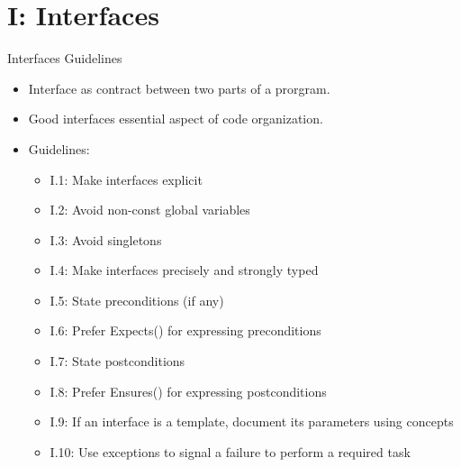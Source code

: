 \section{I: Interfaces}

\begin{frame}[t]{Interfaces Guidelines}
\begin{itemize}
  \item Interface as contract between two parts of a prorgram.
  \item Good interfaces essential aspect of code organization.

  \item Guidelines:
  \begin{itemize}
    \item I.1: Make interfaces explicit
    \item I.2: Avoid non-const global variables
    \item I.3: Avoid singletons
    \item I.4: Make interfaces precisely and strongly typed
    \item I.5: State preconditions (if any)
    \item I.6: Prefer Expects() for expressing preconditions
    \item I.7: State postconditions
    \item I.8: Prefer Ensures() for expressing postconditions
    \item I.9: If an interface is a template, document its parameters using concepts
    \item I.10: Use exceptions to signal a failure to perform a required task
  \end{itemize}
\end{itemize}
\end{frame}




